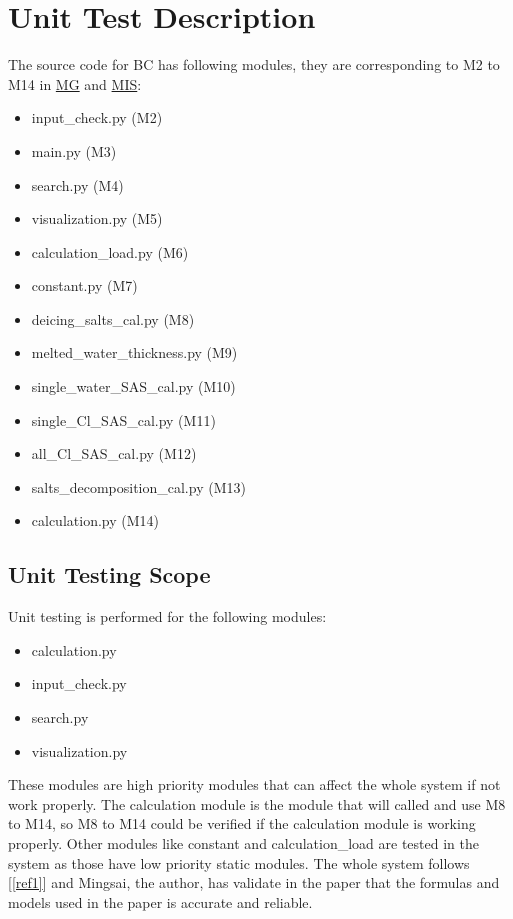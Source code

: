 \documentclass[12pt, titlepage]{article}
\newcommand{\reref}[1]{\ref{#1}}
\begin{document}

\section{Unit Test Description}\label{UTD}
The source code for BC has following modules, they are corresponding to M2 to M14 in \href{https://github.com/CynthiaLiu0805/BridgeCorrosion/blob/main/docs/Design/SoftArchitecture/MG.pdf}{MG} and \href{https://github.com/CynthiaLiu0805/BridgeCorrosion/blob/main/docs/Design/SoftDetailedDes/MIS.pdf}{MIS}:
\begin{itemize}
\item input\_check.py (M2)
\item main.py (M3)
\item search.py (M4)
\item visualization.py (M5)
\item calculation\_load.py (M6)
\item constant.py (M7)
\item deicing\_salts\_cal.py (M8)
\item melted\_water\_thickness.py (M9)
\item single\_water\_SAS\_cal.py (M10)
\item single\_Cl\_SAS\_cal.py (M11)
\item all\_Cl\_SAS\_cal.py (M12)
\item salts\_decomposition\_cal.py (M13)
\item calculation.py (M14)
\end{itemize}

\subsection{Unit Testing Scope}
Unit testing is performed for the following modules:
\begin{itemize}
\item calculation.py
\item input\_check.py
\item search.py
\item visualization.py
\end{itemize}

These modules are high priority modules that can affect the whole system if not work properly. The calculation module is the module that will called and use M8 to M14, so M8 to M14 could be verified if the calculation module is working properly. Other modules like constant and calculation\_load are tested in the system as those
have low priority static modules.
The whole system follows [\reref{ref1}] and Mingsai, the author, has validate in the paper that the formulas and models used in the paper is accurate and reliable. 
\end{document}
